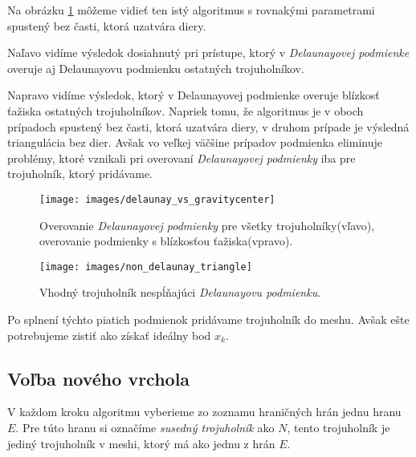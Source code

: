 \begin{enumerate}
{         Na obrázku \ref{obr:delaunay_vs_gravitycenter} môžeme vidieť ten 
         istý algoritmus s rovnakými parametrami spustený bez časti, ktorá uzatvára diery. 
         
         Naľavo vidíme výsledok dosiahnutý pri prístupe, ktorý v \textit{Delaunayovej podmienke} overuje aj
         Delaunayovu podmienku ostatných trojuholníkov. 
         
         Napravo vidíme výsledok, ktorý v Delaunayovej
         podmienke overuje blízkosť ťažiska ostatných trojuholníkov. Napriek tomu, že algoritmus
         je v oboch prípadoch spustený bez časti, ktorá uzatvára diery, v druhom prípade je výsledná 
         triangulácia bez dier. Avšak vo veľkej väčšine prípadov podmienka eliminuje problémy, 
         ktoré vznikali pri overovaní \textit{Delaunayovej podmienky} iba pre trojuholník, ktorý pridávame.
     }

    \begin{figure}
        \centerline{\texttt{[image: images/delaunay\_vs\_gravitycenter]}}
        \caption[Delaunayova podmienka verzus podmienka overujúca blízkosť ťažiska]
        {Overovanie \textit{Delaunayovej podmienky} pre všetky trojuholníky(vľavo), overovanie
        podmienky s blízkosťou ťažiska(vpravo).}
        \label{obr:delaunay_vs_gravitycenter}
    \end{figure}

    \begin{figure}
        \centerline{\texttt{[image: images/non\_delaunay\_triangle]}}
        \caption[Trojuholník nespĺňajúci \textit{Delaunayovu podmienku}]
        {Vhodný trojuholník nespĺňajúci \textit{Delaunayovu podmienku}.}
        \label{obr:non_delaunay_triangle}
    \end{figure}
\end{enumerate}

Po splnení týchto piatich podmienok pridávame trojuholník do meshu. Avšak ešte potrebujeme zistiť 
ako získať ideálny bod $x_k$.

\subsection{Voľba nového vrchola}
\label{kap:finding_new_vertex}

V každom kroku algoritmu vyberieme zo zoznamu hraničných hrán jednu hranu $E$. Pre túto hranu si 
označíme \textit{susedný trojuholník} ako $N$, tento trojuholník je jediný trojuholník v meshi, 
ktorý má ako jednu z hrán $E$. 

